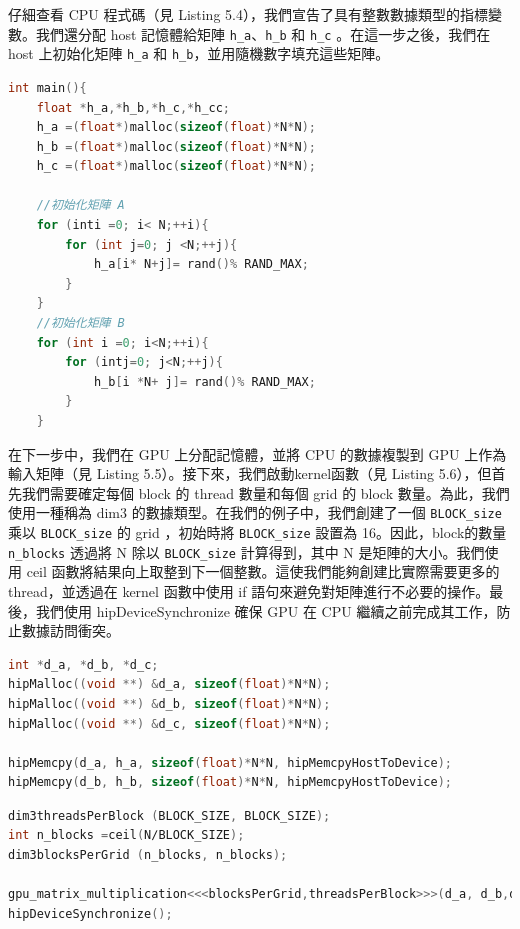 仔細查看 CPU 程式碼（見 Listing 5.4），我們宣告了具有整數數據類型的指標變數。我們還分配 host 記憶體給矩陣 \texttt{h\_a}、\texttt{h\_b} 和 \texttt{h\_c} 。在這一步之後，我們在 host 上初始化矩陣 \texttt{h\_a} 和 \texttt{h\_b}，並用隨機數字填充這些矩陣。

\lstset{style=mystyle}
\begin{lstlisting}[language=c++,caption={CPU 記憶體分配矩陣初始化}]
int main(){
    float *h_a,*h_b,*h_c,*h_cc;
    h_a =(float*)malloc(sizeof(float)*N*N);
    h_b =(float*)malloc(sizeof(float)*N*N);
    h_c =(float*)malloc(sizeof(float)*N*N);

    //初始化矩陣 A
    for (inti =0; i< N;++i){
        for (int j=0; j <N;++j){
            h_a[i* N+j]= rand()% RAND_MAX;
        }
    }
    //初始化矩陣 B
    for (int i =0; i<N;++i){
        for (intj=0; j<N;++j){
            h_b[i *N+ j]= rand()% RAND_MAX;
        }
    }
\end{lstlisting}


在下一步中，我們在 GPU 上分配記憶體，並將 CPU 的數據複製到 GPU 上作為輸入矩陣（見 Listing 5.5）。接下來，我們啟動kernel函數（見 Listing 5.6），但首先我們需要確定每個 block 的 thread 數量和每個 grid 的 block 數量。為此，我們使用一種稱為 dim3 的數據類型。在我們的例子中，我們創建了一個 \texttt{BLOCK\_size} 乘以 \texttt{BLOCK\_size} 的 grid ，初始時將 \texttt{BLOCK\_size} 設置為 16。因此，block的數量 \texttt{n\_blocks} 透過將 N 除以 \texttt{BLOCK\_size} 計算得到，其中 N 是矩陣的大小。我們使用 ceil 函數將結果向上取整到下一個整數。這使我們能夠創建比實際需要更多的thread，並透過在 kernel 函數中使用 if 語句來避免對矩陣進行不必要的操作。最後，我們使用 hipDeviceSynchronize 確保 GPU 在 CPU 繼續之前完成其工作，防止數據訪問衝突。

\lstset{style=mystyle}
\begin{lstlisting}[language=c++,caption={GPU 記憶體分配與資料傳輸（host到device）}]
int *d_a, *d_b, *d_c;
hipMalloc((void **) &d_a, sizeof(float)*N*N);
hipMalloc((void **) &d_b, sizeof(float)*N*N);
hipMalloc((void **) &d_c, sizeof(float)*N*N);

hipMemcpy(d_a, h_a, sizeof(float)*N*N, hipMemcpyHostToDevice);
hipMemcpy(d_b, h_b, sizeof(float)*N*N, hipMemcpyHostToDevice);
\end{lstlisting}

\lstset{style=mystyle}
\begin{lstlisting}[language=c++,caption={kernel啟動}]
dim3threadsPerBlock (BLOCK_SIZE, BLOCK_SIZE);
int n_blocks =ceil(N∕BLOCK_SIZE);
dim3blocksPerGrid (n_blocks, n_blocks);

gpu_matrix_multiplication<<<blocksPerGrid,threadsPerBlock>>>(d_a, d_b,d_c, N);
hipDeviceSynchronize();
\end{lstlisting}


